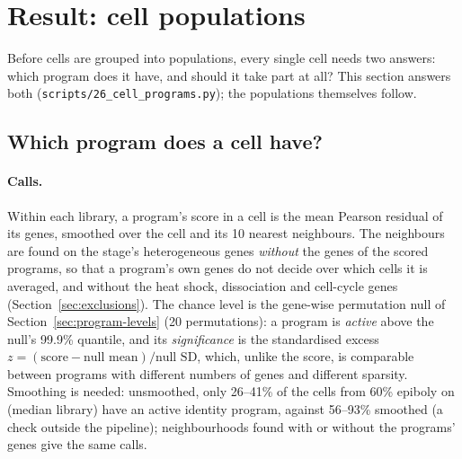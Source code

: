 \documentclass[11pt,a4paper]{article}
\begin{document}
\section{Result: cell populations}
\label{sec:populations}

Before cells are grouped into populations, every single cell needs two answers: which program does it have, and should it take part at all? This section answers both (\nolinkurl{scripts/26_cell_programs.py}); the populations themselves follow.

\subsection{Which program does a cell have?}
\label{sec:cell-programs}

\paragraph{Calls.} Within each library, a program's score in a cell is the mean Pearson residual of its genes, smoothed over the cell and its 10 nearest neighbours. The neighbours are found on the stage's heterogeneous genes \emph{without} the genes of the scored programs, so that a program's own genes do not decide over which cells it is averaged, and without the heat shock, dissociation and cell-cycle genes (Section~\ref{sec:exclusions}). The chance level is the gene-wise permutation null of Section~\ref{sec:program-levels} (20 permutations): a program is \emph{active} above the null's 99.9\% quantile, and its \emph{significance} is the standardised excess $z = (\text{score} - \text{null mean}) / \text{null SD}$, which, unlike the score, is comparable between programs with different numbers of genes and different sparsity. Smoothing is needed: unsmoothed, only 26--41\% of the cells from 60\% epiboly on (median library) have an active identity program, against 56--93\% smoothed (a check outside the pipeline); neighbourhoods found with or without the programs' genes give the same calls.
\end{document}
